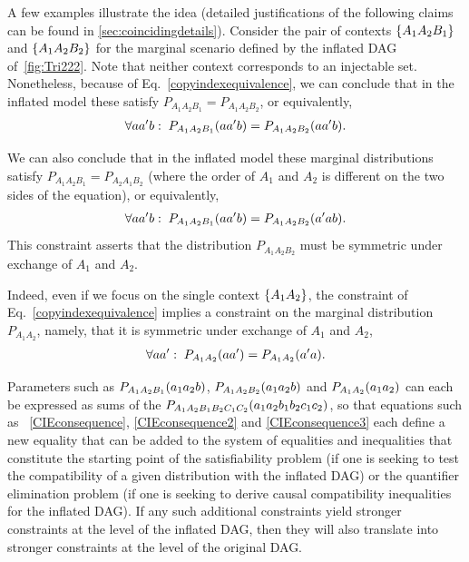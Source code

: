 A few examples illustrate the idea (detailed justifications of the following claims can be found in \cref{sec:coincidingdetails}).
Consider the pair of contexts $\brackets{A_1 A_2 B_1}$ and $\brackets{A_1 A_2 B_2}$ for the marginal scenario defined by the inflated DAG of~\cref{fig:Tri222}.  Note that neither context corresponds to an injectable set.  Nonetheless, because of Eq.~\eqref{copyindexequivalence}, we can conclude that in the inflated model these satisfy  $P_{A_1 A_2 B_1}=P_{A_1 A_2 B_2}$, or equivalently, 
\begin{align}\label{CIEconsequence}
\forall{a a' b}:\;\p[A_1 A_2 B_1]{a a' b} = \p[A_1 A_2 B_2]{a a' b}.
\end{align}

We can also conclude that in the inflated model these marginal distributions satisfy  $P_{A_1 A_2 B_1}=P_{A_2 A_1 B_2}$ (where the order of $A_1$ and $A_2$ is different on the two sides of the equation), or equivalently, 
\begin{align}\label{CIEconsequence2}
\forall{a a' b}:\;\p[A_1 A_2 B_1]{a a' b} = \p[A_1 A_2 B_2]{a' a b}.
\end{align}
This constraint asserts that the distribution $P_{A_1 A_2 B_2}$ must be symmetric under exchange of $A_1$ and $A_2$.  

Indeed, even if we focus on the single context $\brackets{A_1 A_2}$, the constraint of Eq.~\eqref{copyindexequivalence} implies a constraint on the marginal distribution $P_{A_1 A_2}$, namely, that it is symmetric under exchange of $A_1$ and $A_2$, 
\begin{align}\label{CIEconsequence3}
\forall{a a'}:\;\p[A_1 A_2]{a a'} = \p[A_1 A_2 ]{a' a}.
\end{align}


Parameters such as $\p[A_1 A_2 B_1]{a_1 a_2 b}$, $\p[A_1 A_2 B_2]{a_1 a_2 b}$ and $\p[A_1 A_2]{a_1 a_2}$ can each be expressed as sums of the $\pdf[A_1 A_2 B_1 B_2 C_1 C_2]{a_1 a_2 b_1 b_2 c_1 c_2}$, so that equations such as ~\eqref{CIEconsequence}, \eqref{CIEconsequence2} and \eqref{CIEconsequence3} each define a new equality that can be added to the system of equalities and inequalities that constitute the starting point of the satisfiability problem (if one is seeking to test the compatibility of a given distribution with the inflated DAG) or the quantifier elimination problem (if one is seeking to derive causal compatibility inequalities for the inflated DAG).  If any such additional constraints yield stronger constraints at the level of the inflated DAG, then they will also translate into stronger constraints at the level of the original DAG.

